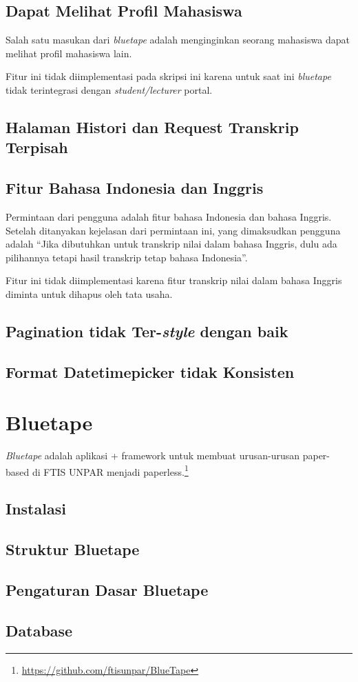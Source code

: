 \subsection{Dapat Melihat Profil Mahasiswa}

\label{issue:18}
Salah satu masukan dari \textit{bluetape} adalah menginginkan seorang mahasiswa dapat melihat profil mahasiswa lain.

Fitur ini tidak diimplementasi pada skripsi ini karena untuk saat ini \textit{bluetape} tidak terintegrasi dengan \textit{student/lecturer} portal.

\subsection{Halaman Histori dan Request Transkrip Terpisah}
\label{issue:19}
\subsection{Fitur Bahasa Indonesia dan Inggris}
\label{issue:20}
Permintaan dari pengguna adalah fitur bahasa Indonesia dan bahasa Inggris. Setelah ditanyakan kejelasan dari permintaan ini, yang dimaksudkan pengguna adalah ``Jika dibutuhkan untuk transkrip nilai dalam bahasa Inggris, dulu ada pilihannya tetapi hasil transkrip tetap bahasa Indonesia''.

Fitur ini tidak diimplementasi karena fitur transkrip nilai dalam bahasa Inggris diminta untuk dihapus oleh tata usaha.
\subsection{Pagination tidak Ter-\textit{style} dengan baik}
\label{issue:22}
\subsection{Format Datetimepicker tidak Konsisten}
\label{issue:23}

\section{Bluetape}

\textit{Bluetape} adalah aplikasi + framework untuk membuat urusan-urusan paper-based di FTIS UNPAR menjadi paperless.\footnote{\url{https://github.com/ftisunpar/BlueTape}}

\subsection{Instalasi}

\subsection{Struktur Bluetape}

\subsection{Pengaturan Dasar Bluetape}

\subsection{Database}